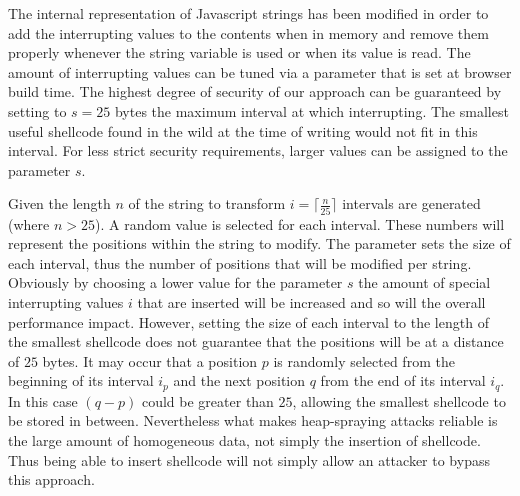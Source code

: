 The internal representation of Javascript strings has been modified in order to add the interrupting values to the contents when in memory and remove them properly whenever the string variable is used or when its value is read. The amount of interrupting values can be tuned via a parameter that is set at browser build time. The highest degree of security of our approach can be guaranteed by setting to $s=25$ bytes the maximum interval at which interrupting. The smallest useful shellcode found in the wild \cite{smallshell} at the time of writing would not fit in this interval. 
For less strict security requirements, larger values can be assigned to the parameter $s$.

Given the length $n$ of the string to transform $i=\lceil \frac{n}{25} \rceil$ intervals are generated (where $n>25$). A random value is selected for each interval. These numbers will represent the positions within the string to modify. The parameter sets the size of each interval, thus the number of positions that will be modified per string. Obviously by choosing a lower value for the parameter $s$ the amount of special interrupting values $i$ that are inserted will be increased and so will the overall performance impact.
However, setting the size of each interval to the length of the smallest shellcode does not guarantee that the positions will be at a distance of $25$ bytes. It may occur that a position $p$ is randomly selected from the beginning of its interval $i_{p}$ and the next position $q$ from the end of its interval $i_{q}$. In this case $(q-p)$ could be greater than $25$, allowing the smallest shellcode to be stored in between. 
Nevertheless what makes heap-spraying attacks reliable is the large amount of homogeneous data, not simply the insertion of shellcode. Thus being able to insert shellcode will not simply allow an attacker to bypass this approach.

